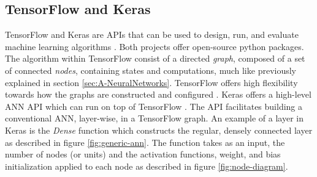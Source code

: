 \documentclass[../main.tex]{subfiles}
\begin{document}
\subsection{TensorFlow and Keras}
\label{sec:A-Tensorflow-and-Keras}
TensorFlow and Keras are APIs that can be used to design, run, and evaluate machine learning algorithms \cite{tensorflow2015-whitepaper, chollet2015keras}.
Both projects offer open-source python packages.
The algorithm within TensorFlow consist of a directed \textit{graph}, composed of a set of connected \textit{nodes}, containing states and computations, much like previously explained in section \ref{sec:A-NeuralNetworks}.
TensorFlow offers high flexibility towards how the graphs are constructed and configured \cite{tensorflow2015-whitepaper}.
Keras offers a high-level \ac{ANN} API which can run on top of TensorFlow \cite{chollet2015keras}.
The API facilitates building a conventional \ac{ANN}, layer-wise, in a TensorFlow graph.
An example of a layer in Keras is the \textit{Dense} function which constructs the regular, densely connected layer as described in figure \ref{fig:generic-ann}.
The function takes as an input, the number of nodes (or units) and the activation functions, weight, and bias initialization applied to each node as described in figure \ref{fig:node-diagram}.
\end{document}
